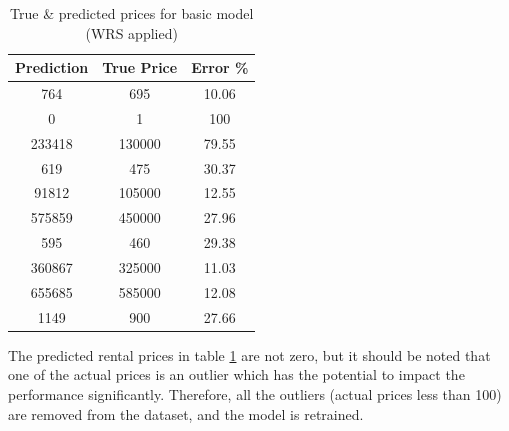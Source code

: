 \documentclass[12pt,twoside]{report}
\begin{document}
\begin{table}[!htbp]
	\centering
	\caption{True \& predicted prices for basic model (WRS applied)}
	\label{basic_model_prediction_price_ws}
	\begin{tabular}{| c | c | c |}
		\hline
		Prediction & True Price & Error \% \\
		\hline
		764 & 695 & 10.06 \\
		\hline
		0 & 1 & 100 \\
		\hline
		233418 & 130000 & 79.55 \\
		\hline
		619 & 475 & 30.37 \\
		\hline
		91812 & 105000 & 12.55 \\
		\hline
		575859 & 450000 & 27.96 \\
		\hline
		595 & 460 & 29.38 \\ 
		\hline
		360867 & 325000 & 11.03 \\
		\hline
		655685 & 585000 & 12.08 \\
		\hline
		1149 & 900 & 27.66 \\
		\hline
	\end{tabular}
\end{table}

The predicted rental prices in table \ref{basic_model_prediction_price_ws} are not zero, but it should be noted that one of the actual prices is an outlier which has the potential to impact the performance significantly. Therefore, all the outliers (actual prices less than 100) are removed from the dataset, and the model is retrained.
\\
\end{document}
